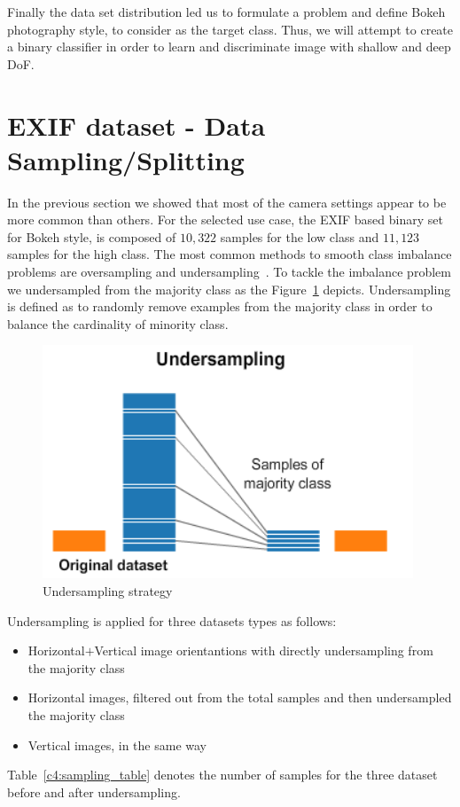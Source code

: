 Finally the data set distribution led us to formulate a problem and define Bokeh photography style, to consider as the target class. Thus, we will attempt to create a binary classifier in order to learn and discriminate image with shallow and deep DoF.


\section{EXIF dataset - Data Sampling/Splitting}
\label{c4:exif_dataset}


In the previous section we showed that most of the camera settings appear to be more common than others.
For the selected use case, the EXIF based binary set for Bokeh style, is composed of $10,322$ samples for the low class and $11,123$ samples for the high class.
The most common methods to smooth class imbalance problems are oversampling and undersampling~\cite{japkowicz2002class}.
To tackle the imbalance problem we undersampled from the majority class as the Figure~\ref{c4:undersample} depicts. Undersampling is defined as to randomly remove examples from the majority class in order to balance the cardinality of minority class.

\begin{figure}[ht!]
    \centering  
    \includegraphics[width=.45\textwidth]{figures/chap4/undersampling}
    \caption{Undersampling strategy}
    \label{c4:undersample}
\end{figure}

Undersampling is applied for three datasets types as follows:
\begin{itemize}
 \item Horizontal$+$Vertical image orientantions with directly undersampling from the majority class
 \item Horizontal images, filtered out from the total samples and then undersampled the majority class
 \item Vertical images, in the same way
\end{itemize}

Table~\ref{c4:sampling_table} denotes the number of samples for the three dataset before and after undersampling.

